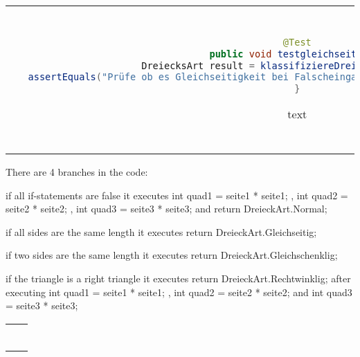 \begin{parlist}
\begin{center}
\begin{tabular}{ | c | c | }
\begin{lstlisting}[language=java,frame=trBL]
@Test
public void testgleichseitig(){
   DreiecksArt result = klassifiziereDreieck(null,null,null);
   assertEquals("Prüfe ob es Gleichseitigkeit bei Falscheingabe erkennt", DriecksArt.Normal, result);
}
  \end{lstlisting} text& Need to check if it will recognize equallateral triangles even if it has bad input. \\
\end{tabular}
\end{center}

\item There are 4 branches in the code:
\begin{list}
\item if all if-statements are false it executes int quad1 = seite1 * seite1; , int quad2 = seite2 * seite2; ,
int quad3 = seite3 * seite3; and return DreieckArt.Normal; 
\item if all sides are the same length it executes return DreieckArt.Gleichseitig;
\item if two sides are the same length it executes return DreieckArt.Gleichschenklig;
\item if the triangle is a right triangle it executes return DreieckArt.Rechtwinklig; after executing int quad1 = seite1 * seite1; , int quad2 = seite2 * seite2; and int quad3 = seite3 * seite3;
\end{list}

\begin{center}
\begin{tabular}{ | c | c | } 
  \hline
  \begin{lstlisting}[language=java,frame=trBL]


\end{lstlisting}
\end{tabular}
\end{center}
\end{parlist}
